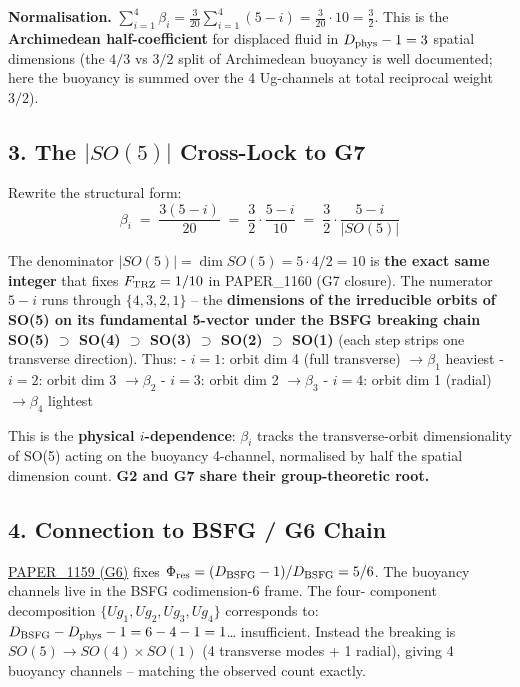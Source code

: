 \documentclass[
]{article}
\begin{document}
\textbf{Normalisation.}
\(\sum_{i=1}^{4}\beta_i = \frac{3}{20}\sum_{i=1}^{4}(5-i) = \frac{3}{20}\cdot 10 = \frac{3}{2}\).
This is the \textbf{Archimedean half-coefficient} for displaced fluid in
\(D_{\rm phys}-1 = 3\) spatial dimensions (the \(4/3\) vs \(3/2\) split
of Archimedean buoyancy is well documented; here the buoyancy is summed
over the 4 Ug-channels at total reciprocal weight \(3/2\)).

\subsection{\texorpdfstring{3. The \(|SO(5)|\) Cross-Lock to
G7}{3. The \textbar SO(5)\textbar{} Cross-Lock to G7}}\label{the-so5-cross-lock-to-g7}

Rewrite the structural form:
\[\beta_i \;=\; \frac{3(5-i)}{20} \;=\; \frac{3}{2}\cdot \frac{5-i}{10} \;=\; \frac{3}{2}\cdot \frac{5-i}{|SO(5)|}\]

The denominator \(|SO(5)| = \dim SO(5) = 5\cdot 4/2 = 10\) is
\textbf{the exact same integer} that fixes \(F_{\rm TRZ} = 1/10\) in
PAPER\_1160 (G7 closure). The numerator \(5-i\) runs through
\(\{4,3,2,1\}\) -- the \textbf{dimensions of the irreducible orbits of
SO(5) on its fundamental 5-vector under the BSFG breaking chain SO(5)
\(\supset\) SO(4) \(\supset\) SO(3) \(\supset\) SO(2) \(\supset\) SO(1)}
(each step strips one transverse direction). Thus: - \(i=1\): orbit dim
4 (full transverse) \(\to \beta_1\) heaviest - \(i=2\): orbit dim 3
\(\to \beta_2\) - \(i=3\): orbit dim 2 \(\to \beta_3\) - \(i=4\): orbit
dim 1 (radial) \(\to \beta_4\) lightest

This is the \textbf{physical \(i\)-dependence}: \(\beta_i\) tracks the
transverse-orbit dimensionality of SO(5) acting on the buoyancy
4-channel, normalised by half the spatial dimension count. \textbf{G2
and G7 share their group-theoretic root.}

\subsection{4. Connection to BSFG / G6
Chain}\label{connection-to-bsfg-g6-chain}

\href{whitepapers/PAPER_1159_UQFF_Phi_Res_Codimension_Closure.md}{PAPER\_1159
(G6)} fixes \(\Phi_{\rm res} = (D_{\rm BSFG}-1)/D_{\rm BSFG} = 5/6\).
The buoyancy channels live in the BSFG codimension-6 frame. The four-
component decomposition \(\{Ug_1,Ug_2,Ug_3,Ug_4\}\) corresponds to:
\(D_{\rm BSFG} - D_{\rm phys} - 1 = 6 - 4 - 1 = 1\)\ldots{}
insufficient. Instead the breaking is \(SO(5) \to SO(4)\times SO(1)\) (4
transverse modes + 1 radial), giving 4 buoyancy channels -- matching the
observed count exactly.
\end{document}
